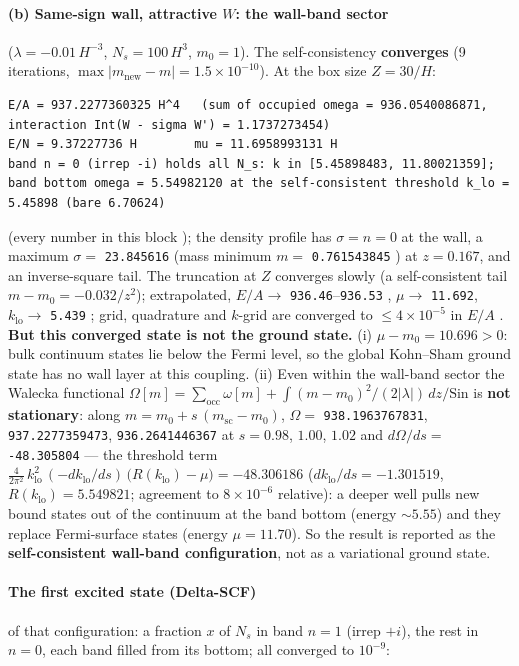 \paragraph{(b) Same-sign wall, attractive $W$: the wall-band sector} ($\lambda=-0.01\,H^{-3}$,
$N_s=100\,H^3$, $m_0=1$). The self-consistency \textbf{converges} (9 iterations,
$\max|m_{\mathrm{new}}-m|=1.5\times10^{-10}$). At the box size $Z=30/H$:
\begin{Verbatim}[fontsize=\scriptsize]
E/A = 937.2277360325 H^4   (sum of occupied omega = 936.0540086871, interaction Int(W - sigma W') = 1.1737273454)
E/N = 9.37227736 H        mu = 11.6958993131 H
band n = 0 (irrep -i) holds all N_s: k in [5.45898483, 11.80021359]; band bottom omega = 5.54982120 at the self-consistent threshold k_lo = 5.45898 (bare 6.70624)
\end{Verbatim}
(every number in this block ); the density profile has $\sigma=n=0$ at the wall, a
maximum $\sigma=$ \texttt{23.845616}  (mass minimum $m=$ \texttt{0.761543845}
) at $z=0.167$, and an inverse-square tail. The truncation at $Z$ converges slowly (a
self-consistent tail $m-m_0=-0.032/z^2$); extrapolated, $E/A\to$ \texttt{936.46}--\texttt{936.53}
, $\mu\to$ \texttt{11.692}, $k_{\mathrm{lo}}\to$ \texttt{5.439}
; grid, quadrature and $k$-grid are converged to $\leq4\times10^{-5}$ in $E/A$
. \textbf{But this converged state is not the ground state.} (i) $\mu-m_0=10.696>0$: bulk
continuum states lie below the Fermi level, so the global Kohn--Sham ground state has no wall layer at this
coupling. (ii) Even within the wall-band sector the Walecka functional
$\Omega[m]=\sum_{\mathrm{occ}}\omega[m]+\int(m-m_0)^2/(2|\lambda|)\,dz/\mathrm{Sin}$ is \textbf{not
stationary}: along $m=m_0+s\,(m_{\mathrm{sc}}-m_0)$, $\Omega=$ \texttt{938.1963767831}, \texttt{937.2277359473},
\texttt{936.2641446367}  at $s=0.98$, $1.00$, $1.02$ and $d\Omega/ds=$ \texttt{-48.305804}
 --- the threshold term
$\frac{4}{2\pi^2}\,k_{\mathrm{lo}}^2\,(-dk_{\mathrm{lo}}/ds)\,\bigl(R(k_{\mathrm{lo}})-\mu\bigr)=-48.306186$
($dk_{\mathrm{lo}}/ds=-1.301519$, $R(k_{\mathrm{lo}})=5.549821$; agreement to $8\times10^{-6}$ relative): a
deeper well pulls new bound states out of the continuum at the band bottom (energy ${\sim}5.55$) and they
replace Fermi-surface states (energy $\mu=11.70$). So the result is reported as the \textbf{self-consistent
wall-band configuration}, not as a variational ground state.

\paragraph{The first excited state (Delta-SCF)} of that configuration: a fraction $x$ of $N_s$ in band $n=1$
(irrep $+i$), the rest in $n=0$, each band filled from its bottom; all converged to $10^{-9}$:

